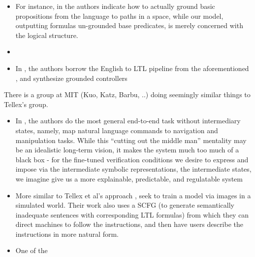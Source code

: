 \documentclass[a4paper, 11pt]{article}
\begin{document}
\begin{itemize}
\item For instance, in \cite{plaku2016motion} the authors indicate how to actually
ground basic propositions from the language to paths in a space, while our
model, outputting formulas un-grounded base predicates, is merely concerned with
the logical structure.

\item 
\item In \cite{7759412}, the authors borrow the English to LTL pipeline from the
  aforementioned \cite{provCorrectNatControl}, and synthesize grounded controllers 
\end{itemize}

There is a group at MIT (Kuo, Katz, Barbu, ..) doing seemingly similar things to
Tellex's group.

\begin{itemize}
\item In \cite{kuo2020deep}, the authors do the most general end-to-end task
  without intermediary states,
  namely, map natural language commands to navigation and manipulation tasks.
  While this ``cutting out the middle man'' mentality may be an idealistic
  long-term vision, it makes the system much too much of a black box - for the
  fine-tuned verification conditions we desire to express and impose via the
  intermediate symbolic representations, the intermediate states, we imagine
  give us a more explainable, predictable, and regulatable system
\item More similar to Tellex et al's approach \cite{patellearning},
  \cite{ltlSemParse} seek to train a model via images in a simulated world.
  Their work also uses a SCFG (to generate semantically inadequate sentences
  with corresponding LTL formulas) from which they can direct machines to
  follow the instructions, and then have users describe the instructions in more
  natural form. 
\item One of the 
\end{itemize}



\printbibliography
\end{document}
